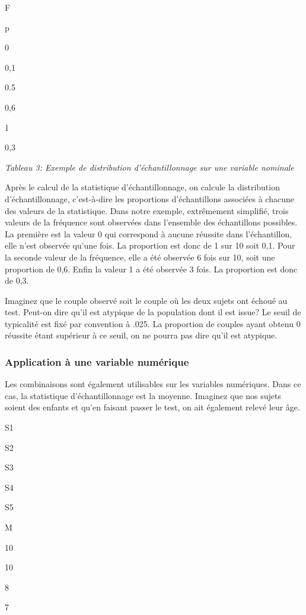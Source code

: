 \documentclass[]{book}
\theoremstyle{definition}
\theoremstyle{definition}
\theoremstyle{definition}
\theoremstyle{remark}
\begin{document}
F

p

0

0,1

0.5

0,6

1

0,3

\emph{Tableau 3: Exemple de distribution d'échantillonnage sur une
variable nominale}

Après le calcul de la statistique d'échantillonnage, on calcule la
distribution d'échantillonnage, c'est-à-dire les proportions
d'échantillons associées à chacune des valeurs de la statistique. Dans
notre exemple, extrêmement simplifié, trois valeurs de la fréquence sont
observées dans l'ensemble des échantillons possibles. La première est la
valeur 0 qui correspond à aucune réussite dans l'échantillon, elle n'est
observée qu'une fois. La proportion est donc de 1 sur 10 soit 0,1. Pour
la seconde valeur de la fréquence, elle a été observée 6 fois sur 10,
soit une proportion de 0,6. Enfin la valeur 1 a été observée 3 fois. La
proportion est donc de 0,3.

Imaginez que le couple observé soit le couple où les deux sujets ont
échoué au test. Peut-on dire qu'il est atypique de la population dont il
est issue? Le seuil de typicalité est fixé par convention à .025. La
proportion de couples ayant obtenu 0 réussite étant supérieur à ce
seuil, on ne pourra pas dire qu'il est atypique.

\hypertarget{application-a-une-variable-numerique}{%
\subsubsection{Application à une variable
numérique}\label{application-a-une-variable-numerique}}

Les combinaisons sont également utilisables sur les variables
numériques. Dans ce cas, la statistique d'échantillonnage est la
moyenne. Imaginez que nos sujets soient des enfants et qu'en faisant
passer le test, on ait également relevé leur âge.

S1

S2

S3

S4

S5

M

10

10

8

7
\end{document}
